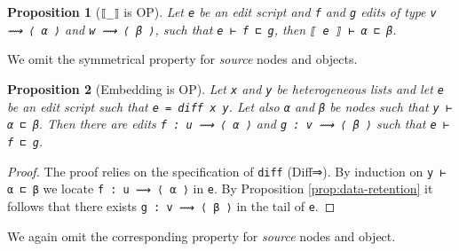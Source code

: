 \documentclass[preprint]{sigplanconf}
\theoremstyle{plain}
\newtheorem{prop}{Proposition}
\begin{document}
\begin{prop}[\texttt{⟦\_⟧} is OP]
\label{prop:order-preserving-target-fun}
Let \texttt{e} be an edit script and \texttt{f} and \texttt{g} edits
of type \texttt{v ⟿ ⟨ α ⟩} and \texttt{w ⟿ ⟨ β ⟩}, such that
\texttt{e ⊢ f ⊏ g}, then \texttt{⟦ e ⟧ ⊢ α ⊏ β}.
\end{prop}
  We omit the symmetrical property for \emph{source} nodes and objects.

\begin{prop}[Embedding is OP]
\label{prop:order-preserving-embedding}
Let \texttt{x} and \texttt{y} be heterogeneous lists and let 
\texttt{e} be an edit script such that \texttt{e = diff x y}.
Let also \texttt{α} and \texttt{β} be nodes such that \texttt{y ⊢ α ⊏ β}.
Then there are edits \texttt{f : u ⟿ ⟨ α ⟩} and \texttt{g : v ⟿ ⟨ β ⟩}
such that \texttt{e ⊢ f ⊏ g}.
\end{prop}
\begin{proof}
  The proof relies on the specification of \texttt{diff} (Diff⇒).
  By induction on \texttt{y ⊢ α ⊏ β} we locate \texttt{f : u ⟿ ⟨ α ⟩}
  in \texttt{e}. By Proposition \ref{prop:data-retention} it follows that
  there exists \texttt{g : v ⟿ ⟨ β ⟩} in the tail of \texttt{e}.
\end{proof}
We again omit the corresponding property for \emph{source} nodes and object.
\end{document}
